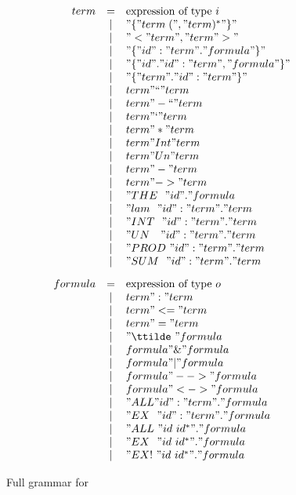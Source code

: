 \begin{figure} 
\dquotes
\[\begin{array}{rcl}
    term & = & \hbox{expression of type~$i$} \\
         & | & "\{ " term\; ("," term)^* " \}" \\
         & | & "< " term ", " term " >" \\
         & | & "\{ " id ":" term " . " formula " \}" \\
         & | & "\{ " id " . " id ":" term "," formula " \}" \\
         & | & "\{ " term " . " id ":" term " \}" \\
         & | & term " `` " term \\
         & | & term " -`` " term \\
         & | & term " ` " term \\
         & | & term " * " term \\
         & | & term " Int " term \\
         & | & term " Un " term \\
         & | & term " - " term \\
         & | & term " -> " term \\
         & | & "THE~~"  id  " . " formula\\
         & | & "lam~~"  id ":" term " . " term \\
         & | & "INT~~"  id ":" term " . " term \\
         & | & "UN~~~"  id ":" term " . " term \\
         & | & "PROD~"  id ":" term " . " term \\
         & | & "SUM~~"  id ":" term " . " term \\[2ex]
 formula & = & \hbox{expression of type~$o$} \\
         & | & term " : " term \\
         & | & term " <= " term \\
         & | & term " = " term \\
         & | & "\ttilde\ " formula \\
         & | & formula " \& " formula \\
         & | & formula " | " formula \\
         & | & formula " --> " formula \\
         & | & formula " <-> " formula \\
         & | & "ALL " id ":" term " . " formula \\
         & | & "EX~~" id ":" term " . " formula \\
         & | & "ALL~" id~id^* " . " formula \\
         & | & "EX~~" id~id^* " . " formula \\
         & | & "EX!~" id~id^* " . " formula
  \end{array}
\]
\caption{Full grammar for {\ZF}} \label{ZF-syntax}
\end{figure} 


